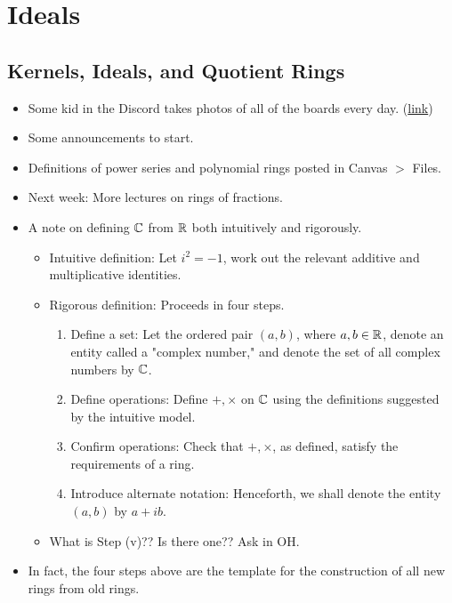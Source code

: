 \documentclass[../notes.tex]{subfiles}
\begin{document}
\chapter{Ideals}
\section{Kernels, Ideals, and Quotient Rings}
\begin{itemize}
    \item {}Some kid in the Discord takes photos of all of the boards every day. (\href{https://uchicagoedu-my.sharepoint.com/:o:/g/personal/billion_uchicago_edu/EgDZ297OD3FFvttHn7lDZZ4BSlzTJFdABON3AdyzvqNyZA?e=D4C5Gs}{link})
    \item Some announcements to start.
    \item Definitions of power series and polynomial rings posted in Canvas $>$ Files.
    \item Next week: More lectures on rings of fractions.
    \item A note on defining $\mathbb{C}$ from $\mathbb{R}$ both intuitively and rigorously.
    \begin{itemize}
        \item Intuitive definition: Let $i^2=-1$, work out the relevant additive and multiplicative identities.
        \item Rigorous definition: Proceeds in four steps.
        \begin{enumerate}[label={(\roman*)}]
            \item Define a set: Let the ordered pair $(a,b)$, where $a,b\in\mathbb{R}$, denote an entity called a "complex number," and denote the set of all complex numbers by $\mathbb{C}$.
            \item Define operations: Define $+,\times$ on $\mathbb{C}$ using the definitions suggested by the intuitive model.
            \item Confirm operations: Check that $+,\times$, as defined, satisfy the requirements of a ring.
            \item Introduce alternate notation: Henceforth, we shall denote the entity $(a,b)$ by $a+ib$.
        \end{enumerate}
        \item What is Step (v)?? Is there one?? Ask in OH.
    \end{itemize}
    \item In fact, the four steps above are the template for the construction of all new rings from old rings.
    \begin{itemize}

\end{itemize}
\end{itemize}
\end{document}
